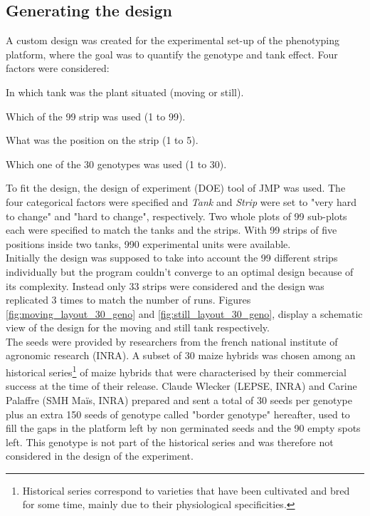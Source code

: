 \subsection{Generating the design}
A custom design was created for the experimental set-up of the phenotyping platform, where the goal was to quantify the genotype 
and tank effect. Four factors were considered:

\begin{description}[align=left]
\item [Tank] In which tank was the plant situated (moving or still).
\item [Strip] Which of the 99 strip was used (1 to 99).
\item [Position] What was the position on the strip (1 to 5).
\item [Genotype] Which one of the 30 genotypes was used (1 to 30).
\end{description}

To fit the design, the design of experiment (DOE) tool of JMP was used. The four categorical factors were specified and 
\textit{Tank} and \textit{Strip} were set to "very hard to change" and "hard to change", respectively. Two whole plots of 99 
sub-plots each were specified to match the tanks and the strips. With 99 strips of five positions inside two tanks, 990 
experimental units were available.\\
Initially the design was supposed to take into account the 99 different strips individually but the program couldn't converge to 
an optimal design because of its complexity. Instead only 33 strips were considered and the design was replicated 3 times to 
match the number of runs. Figures \ref{fig:moving_layout_30_geno} and \ref{fig:still_layout_30_geno}, display a schematic view 
of the design for the moving and still tank respectively.\\
The seeds were provided by researchers from the french national institute of agronomic research (INRA). A subset of 30 maize hybrids was chosen among an historical series\footnote{Historical series correspond to varieties that have been cultivated and bred for 
some time, mainly due to their physiological specificities.} of maize hybrids that were characterised by their commercial success at the time of their release. Claude Wlecker (LEPSE, INRA) and Carine Palaffre (SMH Maïs, INRA) prepared and sent a total of 30 seeds per genotype plus an extra 150 seeds of genotype called "border genotype" hereafter, used to fill the gaps in the platform left by non germinated seeds and the 90 empty spots left. This genotype is not part of the historical series and was therefore not considered in the design of the experiment.

